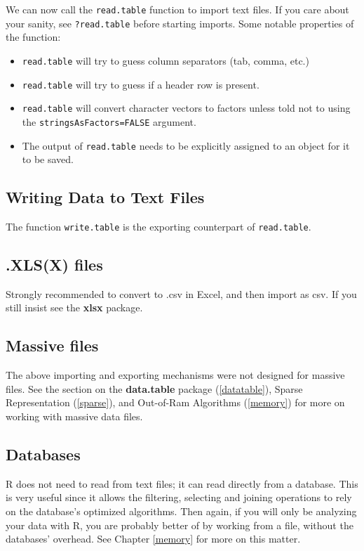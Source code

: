\documentclass[]{book}
\providecommand{\tightlist}{%
  \setlength{\itemsep}{0pt}\setlength{\parskip}{0pt}}
\theoremstyle{definition}
\theoremstyle{definition}
\theoremstyle{definition}
\theoremstyle{remark}
\begin{document}
We can now call the \texttt{read.table} function to import text files.
If you care about your sanity, see \texttt{?read.table} before starting
imports. Some notable properties of the function:

\begin{itemize}
\tightlist
\item
  \texttt{read.table} will try to guess column separators (tab, comma,
  etc.)
\item
  \texttt{read.table} will try to guess if a header row is present.
\item
  \texttt{read.table} will convert character vectors to factors unless
  told not to using the \texttt{stringsAsFactors=FALSE} argument.
\item
  The output of \texttt{read.table} needs to be explicitly assigned to
  an object for it to be saved.
\end{itemize}

\subsection{Writing Data to Text
Files}\label{writing-data-to-text-files}

The function \texttt{write.table} is the exporting counterpart of
\texttt{read.table}.

\subsection{.XLS(X) files}\label{xlsx-files}

Strongly recommended to convert to .csv in Excel, and then import as
csv. If you still insist see the \textbf{xlsx} package.

\subsection{Massive files}\label{massive-files}

The above importing and exporting mechanisms were not designed for
massive files. See the section on the \textbf{data.table} package
(\ref{datatable}), Sparse Representation (\ref{sparse}), and Out-of-Ram
Algorithms (\ref{memory}) for more on working with massive data files.

\subsection{Databases}\label{databases}

R does not need to read from text files; it can read directly from a
database. This is very useful since it allows the filtering, selecting
and joining operations to rely on the database's optimized algorithms.
Then again, if you will only be analyzing your data with R, you are
probably better of by working from a file, without the databases'
overhead. See Chapter \ref{memory} for more on this matter.
\end{document}
